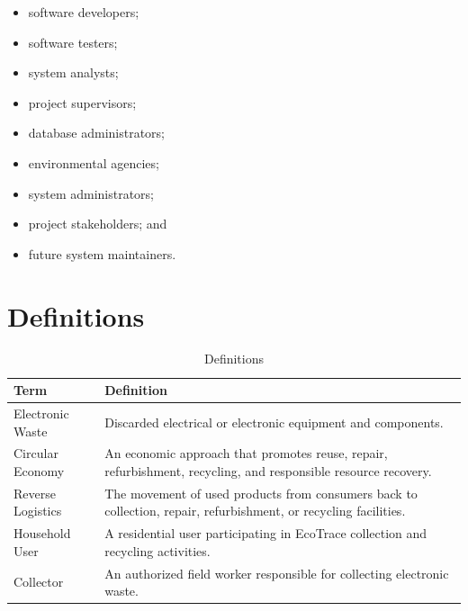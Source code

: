 \begin{itemize}

\item software developers;

\item software testers;

\item system analysts;

\item project supervisors;

\item database administrators;

\item environmental agencies;

\item system administrators;

\item project stakeholders; and

\item future system maintainers.

\end{itemize}

\section{Definitions}
\label{sec:definitions}

\begin{table}[H]
\centering
\caption{Definitions}

\begin{tabularx}{\textwidth}{
    |p{4cm}|
    X|
}

\hline
\textbf{Term} &
\textbf{Definition} \\

\hline
Electronic Waste &
Discarded electrical or electronic equipment and components. \\

\hline
Circular Economy &
An economic approach that promotes reuse, repair, refurbishment,
recycling, and responsible resource recovery. \\

\hline
Reverse Logistics &
The movement of used products from consumers back to collection,
repair, refurbishment, or recycling facilities. \\

\hline
Household User &
A residential user participating in EcoTrace collection and recycling
activities. \\

\hline
Collector &
An authorized field worker responsible for collecting electronic
waste. \\

\hline

\end{tabularx}
\end{table}

